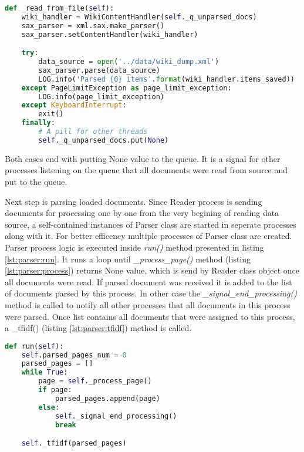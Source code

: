 \begin{lstlisting}[language=Python, caption={Reader.\_read\_from\_file() - reading documents from XML file}, label={lst:reader:xml}]
def _read_from_file(self):
    wiki_handler = WikiContentHandler(self._q_unparsed_docs)
    sax_parser = xml.sax.make_parser()
    sax_parser.setContentHandler(wiki_handler)

    try:
        data_source = open('../data/wiki_dump.xml')
        sax_parser.parse(data_source)
        LOG.info('Parsed {0} items'.format(wiki_handler.items_saved))
    except PageLimitException as page_limit_exception:
        LOG.info(page_limit_exception)
    except KeyboardInterrupt:
        exit()
    finally:
        # A pill for other threads
        self._q_unparsed_docs.put(None)
\end{lstlisting} \label{impl-reader-xml}

Both cases end with putting None value to the queue. It is a signal for other processes listening on the queue that all documents were read from source and put to the queue.

Next step is parsing loaded documents. Since Reader process is sending documents for processing one by one from the very begining of reading data source, a self-contained instances of Parser class are started in seperate processes along with it. For better efficency multiple processes of Parser class are created. \\

Parser process logic is executed inside \textit{run()} method presented in listing \ref{lst:parser:run}. It runs a loop until \textit{\_process\_page()} method (listing \ref{lst:parser:process}) returns None value, which is send by Reader class object once all documents were read. If parsed document was received it is added to the list of documents parsed by this process. In other case the \textit{\_signal\_end\_processing()} method is called to notify all other processes that all documents in this process were parsed. Once list contains all documents that were assigned to this process, a \_tfidf() (listing \ref{lst:parser:tfidf}) method is called.

\begin{lstlisting}[language=Python, caption={Parser.run() - Parser class process main method}, label={lst:parser:run}]
def run(self):
    self.parsed_pages_num = 0
    parsed_pages = []
    while True:
        page = self._process_page()
        if page:
            parsed_pages.append(page)
        else:
            self._signal_end_processing()
            break

    self._tfidf(parsed_pages)
\end{lstlisting}

